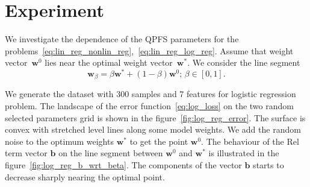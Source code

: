 \documentclass[a4paper,12pt]{article}
\theoremstyle{plain} %
\theoremstyle{definition} %
\theoremstyle{remark} %
\newcommand{\bb}{\mathbf{b}}
\newcommand{\bw}{\mathbf{w}}
\begin{document}
  	\section*{Experiment}
  	
  	We investigate the dependence of the QPFS parameters for the problems~\eqref{eq:lin_reg_nonlin_reg},~\eqref{eq:lin_reg_log_reg}. 
  	Assume that weight vector~$\bw^0$ lies near the optimal weight vector~$\bw^*$. 
  	We consider the line segment
  	\[
  	\bw_{\beta} = \beta \bw^* + (1 - \beta) \bw^0; \, \beta \in [0, 1] .
  	\]
  	
  	We generate the dataset with 300 samples and 7 features for logistic regression problem. 
  	The landscape of the error function~\eqref{eq:log_loss} on the two random selected parameters grid is shown in the figure~\ref{fig:log_reg_error}.
  	The surface is convex with stretched level lines along some model weights.
  	We add the random noise to the optimum weights $\bw^*$ to get the point $\bw^0$. The behaviour of the Rel term vector $\bb$ on the line segment between $\bw^0$ and $\bw^*$ is illustrated in the figure~\ref{fig:log_reg_b_wrt_beta}.
  	The components of the vector $\bb$ starts to decrease sharply nearing the optimal point.
\end{document}
